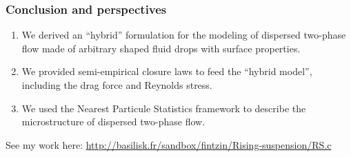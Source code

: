 \documentclass{sintefbeamer}
\begin{document}
\begin{frame}
  \frametitle{Conclusion and perspectives}

  \begin{enumerate}
    \item We derived an ``hybrid'' formulation for the  modeling of dispersed two-phase flow made of arbitrary shaped fluid drops with surface properties. 
    \item We provided semi-empirical closure laws to feed the ``hybrid model'',  including the drag force and Reynolds stress. 
    \item We used the Nearest Particule Statistics framework to describe the microstructure of dispersed two-phase flow. 
  \end{enumerate}
\vfill    
See my work here: \url{http://basilisk.fr/sandbox/fintzin/Rising-suspension/RS.c}

\end{frame}

\backmatter

\begin{frame}
  \footnotesize
  

\end{frame}
\end{document}
